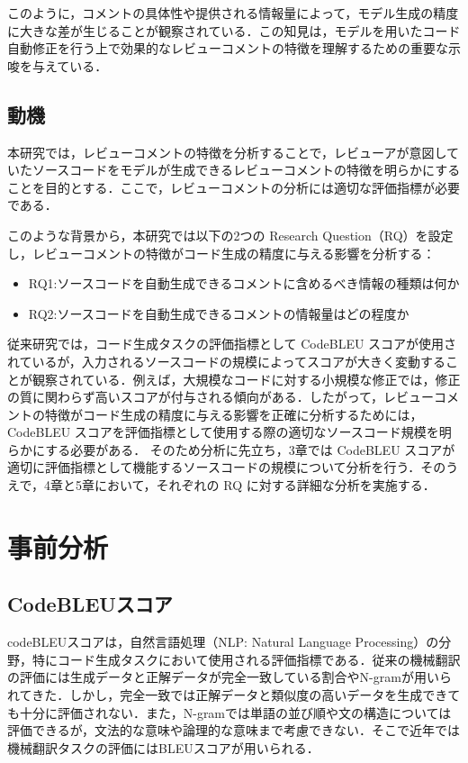 \documentclass[11pt]{jreport}
\newcommand{\RQone}{ソースコードを自動生成できるコメントに含めるべき情報の種類は何か}
\newcommand{\RQtwo}{ソースコードを自動生成できるコメントの情報量はどの程度か}
\begin{document}
このように，コメントの具体性や提供される情報量によって，モデル生成の精度に大きな差が生じることが観察されている．この知見は，モデルを用いたコード自動修正を行う上で効果的なレビューコメントの特徴を理解するための重要な示唆を与えている．

\section{動機}

本研究では，レビューコメントの特徴を分析することで，レビューアが意図していたソースコードをモデルが生成できるレビューコメントの特徴を明らかにすることを目的とする．ここで，レビューコメントの分析には適切な評価指標が必要である．

このような背景から，本研究では以下の2つの Research Question（RQ）を設定し，レビューコメントの特徴がコード生成の精度に与える影響を分析する：

\begin{itemize}
\item RQ1:\RQone
\item RQ2:\RQtwo
\end{itemize}

従来研究では，コード生成タスクの評価指標として CodeBLEU スコアが使用されているが，入力されるソースコードの規模によってスコアが大きく変動することが観察されている．例えば，大規模なコードに対する小規模な修正では，修正の質に関わらず高いスコアが付与される傾向がある．したがって，レビューコメントの特徴がコード生成の精度に与える影響を正確に分析するためには，CodeBLEU スコアを評価指標として使用する際の適切なソースコード規模を明らかにする必要がある．
そのため分析に先立ち，3章では CodeBLEU スコアが適切に評価指標として機能するソースコードの規模について分析を行う．そのうえで，4章と5章において，それぞれの RQ に対する詳細な分析を実施する．

\chapter{事前分析}\label{chap:fig-tab-exp}

\section {CodeBLEUスコア}

codeBLEUスコア\cite{ren2020codebleu}は，自然言語処理（NLP: Natural Language Processing）の分野，特にコード生成タスクにおいて使用される評価指標である．従来の機械翻訳の評価には生成データと正解データが完全一致している割合やN-gramが用いられてきた．しかし，完全一致では正解データと類似度の高いデータを生成できても十分に評価されない．また，N-gramでは単語の並び順や文の構造については評価できるが，文法的な意味や論理的な意味まで考慮できない．そこで近年では機械翻訳タスクの評価にはBLEU\cite{papineni2002bleu}スコアが用いられる．
\end{document}
